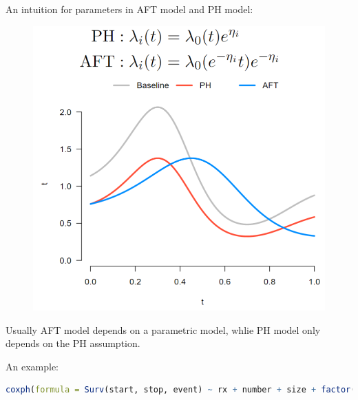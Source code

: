     An intuition for parameters in AFT model and PH model:
\begin{figure}[H]
    \centering
    \includegraphics[width=0.45\linewidth]{sections/images/2022-08-19-10-03-10.png}
    \label{}
\end{figure}

    Usually AFT model depends on a parametric model, whlie PH model only depends on the PH assumption.



\begin{rcode}
    An example:
\begin{lstlisting}[language=R]
coxph(formula = Surv(start, stop, event) ~ rx + number + size + factor(enum), data = bladder2)
\end{lstlisting}
\end{rcode}
    
    


    

